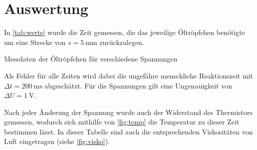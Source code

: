 \section{Auswertung}
\label{sec:Auswertung}
In \autoref{tab:werte} wurde die Zeit gemessen, die das jeweilige Öltröpfchen benötigte um eine Strecke von $s = \qty{5}{\milli\meter}$ zurückzulegen.

\begin{table}[H]
    \caption{Messdaten der Öltröpfchen für verschiedene Spannungen}
    \label{tab:werte}
    \centering
    \begin{minipage}[t]{0.25\textwidth}
        \small
        \label{stab:175}
        
    \end{minipage}\qquad
    \begin{minipage}[t]{0.25\textwidth}
        \small
        \label{stab:200}
        
    \end{minipage}\qquad
    \begin{minipage}[t]{0.25\textwidth}
        \small
        \label{stab:225}
        
    \end{minipage}\qquad
    \begin{minipage}[t]{0.25\textwidth}
        \small
        \label{stab:250}
        
    \end{minipage}\qquad
    \begin{minipage}[t]{0.25\textwidth}
        \small
        \label{stab:275}
        
    \end{minipage}
\end{table}

Als Fehler für alle Zeiten wird dabei die ungefähre menschliche Reaktionszeit mit $\Delta t = \qty{200}{\milli\second}$ abgeschätzt.
Für die Spannungen gilt eine Ungenauigkeit von $\Delta U = \qty{1}{\volt}$.

Nach jeder Änderung der Spannung wurde auch der Widerstand des Thermistors gemessen, wodurch sich mithilfe von \autoref{fig:temp} die Temperatur zu dieser Zeit bestimmen lässt. In dieser Tabelle sind auch die entsprechenden Viskositäten von Luft eingetragen (siehe \autoref{fig:visko}).


